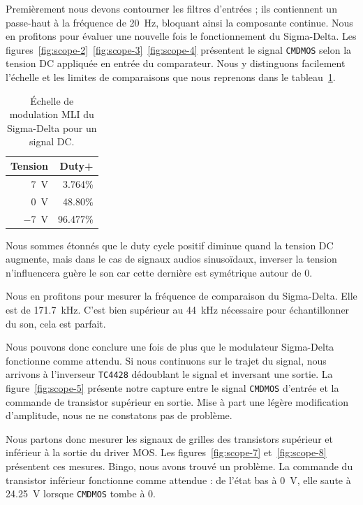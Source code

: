 \documentclass[10pt, oneside, a4paper]{article}
\begin{document}
Premièrement nous devons contourner les filtres d'entrées ; ils contiennent un passe-haut à la fréquence de \SI{20}{\hertz}, bloquant ainsi la composante continue.
Nous en profitons pour évaluer une nouvelle fois le fonctionnement du Sigma-Delta.
Les figures~\ref{fig:scope-2}~\ref{fig:scope-3}~\ref{fig:scope-4} présentent le signal \texttt{CMDMOS} selon la tension DC appliquée en entrée du comparateur.
Nous y distinguons facilement l'échelle et les limites de comparaisons que nous reprenons dans le tableau~\ref{tab:dutyCycleDC}.
\begin{table}[!ht]
    \centering
    \begin{tabular}{|r|r|}
    \hline
    Tension & Duty+ \\
    \hline
    \SI{7}{\volt}  & \num{3.764}\% \\
    \SI{0}{\volt}  & \num{48.80}\% \\
    \SI{-7}{\volt} & \num{96.477}\% \\
    \hline
    \end{tabular}
    \caption{Échelle de modulation MLI du Sigma-Delta pour un signal DC.}
    \label{tab:dutyCycleDC}
\end{table}
Nous sommes étonnés que le duty cycle positif diminue quand la tension DC augmente, mais dans le cas de signaux audios sinusoïdaux, inverser la tension n'influencera guère le son car cette dernière est symétrique autour de 0.

Nous en profitons pour mesurer la fréquence de comparaison du Sigma-Delta.
Elle est de \SI{171.7}{\kilo\hertz}.
C'est bien supérieur au \SI{44}{\kilo\hertz} nécessaire pour échantillonner du son, cela est parfait.

Nous pouvons donc conclure une fois de plus que le modulateur Sigma-Delta fonctionne comme attendu.
Si nous continuons sur le trajet du signal, nous arrivons à l'inverseur \texttt{TC4428} dédoublant le signal et inversant une sortie.
La figure~\ref{fig:scope-5} présente notre capture entre le signal \texttt{CMDMOS} d'entrée et la commande de transistor supérieur en sortie.
Mise à part une légère modification d'amplitude, nous ne ne constatons pas de problème.

Nous partons donc mesurer les signaux de grilles des transistors supérieur et inférieur à la sortie du driver MOS.
Les figures~\ref{fig:scope-7} et~\ref{fig:scope-8} présentent ces mesures.
Bingo, nous avons trouvé un problème.
La commande du transistor inférieur fonctionne comme attendue : de l'état bas à \SI{0}{\volt}, elle saute à \SI{24.25}{\volt} lorsque \texttt{CMDMOS} tombe à 0.
\end{document}
